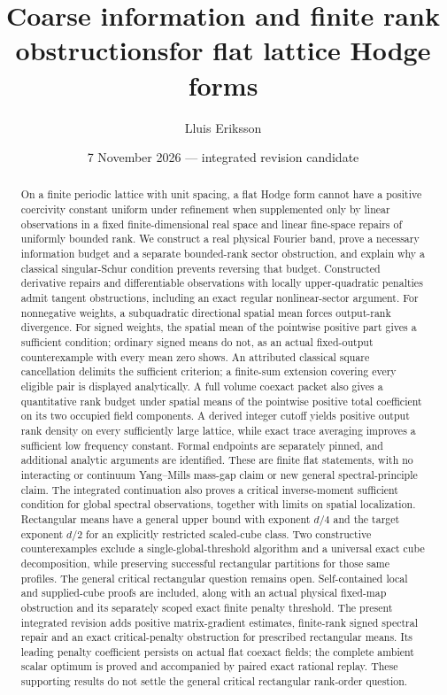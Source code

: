 \documentclass[11pt]{article}
\title{Coarse information and finite rank obstructions\newline for flat lattice Hodge forms}
\author{Lluis Eriksson}
\date{7 November 2026 --- integrated revision candidate}
\begin{document}
\maketitle
\begin{abstract}
On a finite periodic lattice with unit spacing, a flat Hodge form cannot
have a positive coercivity constant uniform under refinement when supplemented
only by linear observations in a fixed finite-dimensional real space and
linear fine-space repairs of uniformly bounded rank. We construct a real
physical Fourier band, prove a necessary information budget and a separate
bounded-rank sector obstruction, and explain why a classical singular-Schur
condition prevents reversing that budget. Constructed derivative repairs
and differentiable observations with locally upper-quadratic penalties
admit tangent obstructions, including an exact regular nonlinear-sector
argument. For nonnegative weights, a subquadratic directional spatial mean
forces output-rank divergence. For signed weights, the spatial mean of the
pointwise positive part gives a sufficient condition; ordinary signed means
do not, as an actual fixed-output counterexample with every mean zero shows.
An attributed classical square cancellation delimits the sufficient criterion;
a finite-sum extension covering every eligible pair is displayed analytically.
A full volume coexact packet also gives a quantitative rank budget under
spatial means of the pointwise positive total coefficient on its two occupied
field components. A derived integer cutoff yields positive output rank density
on every sufficiently large lattice, while exact trace averaging improves a
sufficient low frequency constant. Formal endpoints are separately pinned, and additional analytic arguments
are identified. These are finite flat statements, with no interacting or
continuum Yang--Mills mass-gap claim or new general spectral-principle claim.
The integrated continuation also proves a critical inverse-moment sufficient
condition for global spectral observations, together with limits on spatial
localization. Rectangular means have a general upper bound with exponent
$d/4$ and the target exponent $d/2$ for an explicitly restricted scaled-cube
class. Two constructive counterexamples exclude a single-global-threshold
algorithm and a universal exact cube decomposition, while preserving successful
rectangular partitions for those same profiles. The general critical
rectangular question remains open. Self-contained local and supplied-cube proofs
are included, along with an actual physical fixed-map obstruction and its
separately scoped exact finite penalty threshold.
The present integrated revision adds positive matrix-gradient estimates,
finite-rank signed spectral repair and an exact critical-penalty obstruction
for prescribed rectangular means. Its leading penalty coefficient persists
on actual flat coexact fields; the complete ambient scalar optimum is
proved and accompanied by paired exact rational replay. These supporting
results do not settle the general critical rectangular rank-order question.
\end{abstract}
\end{document}
